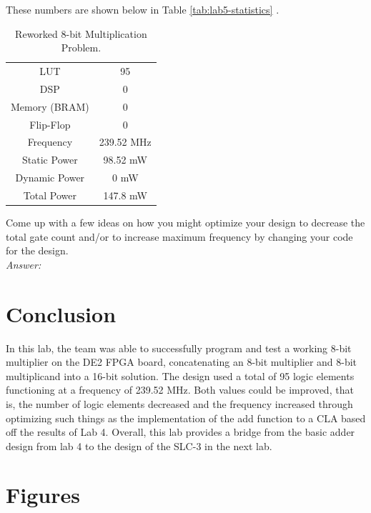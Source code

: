 \documentclass[journal, twocolumn, final,11pt,letterpaper]{IEEEtran}
\begin{document}
These numbers are shown below in Table \ref{tab:lab5-statistics} .

\begin{table}[htbp]
	\centering
	\caption{Reworked 8-bit Multiplication Problem. }
	\begin{tabular}{c|c}	%
		\toprule	%
		LUT & 95\\
		DSP & 0\\
		Memory (BRAM) & 0\\
		Flip-Flop & 0\\
		Frequency & 239.52 MHz\\
		Static Power & 98.52 mW\\
		Dynamic Power & 0 mW\\
		Total Power & 147.8 mW\\
	
		\bottomrule	%
	\end{tabular}%
	\label{tab:table2}	%
\end{table}%
 
Come up with a few ideas on how you might optimize your design to decrease the total gate count and/or to increase maximum frequency by changing your code for the design.\\

\textit{Answer:} 

\section{Conclusion}
In this lab, the team was able to successfully program and test a working 8-bit multiplier on the DE2 FPGA board, concatenating an 8-bit multiplier and 8-bit multiplicand into a 16-bit solution.  The design used a total of 95 logic elements functioning at a frequency of 239.52 MHz.  Both values could be improved, that is, the number of logic elements decreased and the frequency increased through optimizing such things as the implementation of the add function to a CLA based off the results of Lab 4.  Overall, this lab provides a bridge from the basic adder design from lab 4 to the design of the SLC-3 in the next lab.    

\clearpage
\onecolumn
\section{Figures}
\end{document}
